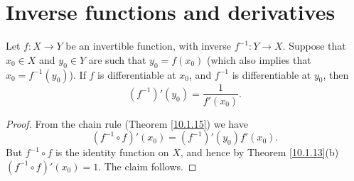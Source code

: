 \section{Inverse functions and derivatives}\label{sec 10.4}

\begin{lemma}\label{10.4.1}
    Let \(f : X \to Y\) be an invertible function, with inverse \(f^{-1} : Y \to X\).
    Suppose that \(x_0 \in X\) and \(y_0 \in Y\) are such that \(y_0 = f(x_0)\)
    (which also implies that \(x_0 = f^{-1}(y_0)\)).
    If \(f\) is differentiable at \(x_0\), and \(f^{-1}\) is differentiable at \(y_0\), then
    \[
        (f^{-1})'(y_0) = \frac{1}{f'(x_0)}.
    \]
\end{lemma}

\begin{proof}
    From the chain rule (Theorem \ref{10.1.15}) we have
    \[
        (f^{-1} \circ f)'(x_0) = (f^{-1})'(y_0) f'(x_0).
    \]
    But \(f^{-1} \circ f\) is the identity function on \(X\), and hence by Theorem \ref{10.1.13}(b) \((f^{-1} \circ f)'(x_0) = 1\).
    The claim follows.
\end{proof}
